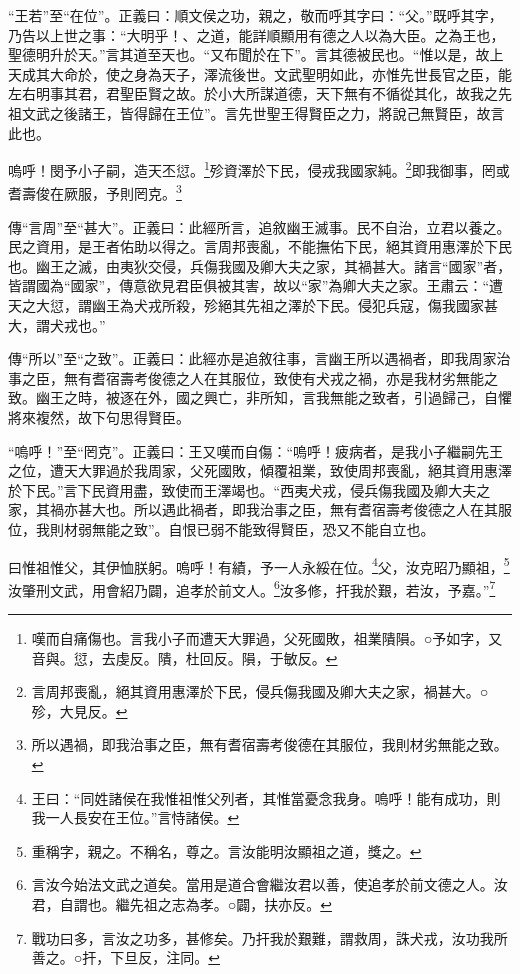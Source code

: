 {\noindent\shu{}\fzkt “王若”至“在位”。正義曰：順文侯之功，親之，敬而呼其字曰：“父。”既呼其字，乃告以上世之事：“大明乎！、之道，能詳順顯用有德之人以為大臣。之為王也，聖德明升於天。”言其道至天也。“又布聞於在下”。言其德被民也。“惟以是，故上天成其大命於，使之身為天子，澤流後世。文武聖明如此，亦惟先世長官之臣，能左右明事其君，君聖臣賢之故。於小大所謀道德，天下無有不循從其化，故我之先祖文武之後諸王，皆得歸在王位”。言先世聖王得賢臣之力，將說己無賢臣，故言此也。 \par}

嗚呼！閔予小子嗣，造天丕愆。\footnote{嘆而自痛傷也。言我小子而遭天大罪過，父死國敗，祖業隤隕。○予如字，又音與。愆，去虔反。隤，杜回反。隕，于敏反。}殄資澤於下民，侵戎我國家純。\footnote{言周邦喪亂，絕其資用惠澤於下民，侵兵傷我國及卿大夫之家，禍甚大。○殄，大見反。}即我御事，罔或耆壽俊在厥服，予則罔克。\footnote{所以遇禍，即我治事之臣，無有耆宿壽考俊德在其服位，我則材劣無能之致。}


{\noindent\zhuan{}\fzbyks 傳“言周”至“甚大”。正義曰：此經所言，追敘幽王滅事。民不自治，立君以養之。民之資用，是王者佑助以得之。言周邦喪亂，不能撫佑下民，絕其資用惠澤於下民也。幽王之滅，由夷狄交侵，兵傷我國及卿大夫之家，其禍甚大。諸言“國家”者，皆謂國為“國家”，傳意欲見君臣俱被其害，故以“家”為卿大夫之家。王肅云：“遭天之大愆，謂幽王為犬戎所殺，殄絕其先祖之澤於下民。侵犯兵寇，傷我國家甚大，謂犬戎也。” \par}

{\noindent\zhuan{}\fzbyks 傳“所以”至“之致”。正義曰：此經亦是追敘往事，言幽王所以遇禍者，即我周家治事之臣，無有耆宿壽考俊德之人在其服位，致使有犬戎之禍，亦是我材劣無能之致。幽王之時，被逐在外，國之興亡，非所知，言我無能之致者，引過歸己，自懼將來複然，故下句思得賢臣。 \par}

{\noindent\shu{}\fzkt “嗚呼！”至“罔克”。正義曰：王又嘆而自傷：“嗚呼！疲病者，是我小子繼嗣先王之位，遭天大罪過於我周家，父死國敗，傾覆祖業，致使周邦喪亂，絕其資用惠澤於下民。”言下民資用盡，致使而王澤竭也。“西夷犬戎，侵兵傷我國及卿大夫之家，其禍亦甚大也。所以遇此禍者，即我治事之臣，無有耆宿壽考俊德之人在其服位，我則材弱無能之致”。自恨已弱不能致得賢臣，恐又不能自立也。 \par}

曰惟祖惟父，其伊恤朕躬。嗚呼！有績，予一人永綏在位。\footnote{王曰：“同姓諸侯在我惟祖惟父列者，其惟當憂念我身。嗚呼！能有成功，則我一人長安在王位。”言恃諸侯。}父，汝克昭乃顯祖，\footnote{重稱字，親之。不稱名，尊之。言汝能明汝顯祖之道，獎之。}汝肇刑文武，用會紹乃闢，追孝於前文人。\footnote{言汝今始法文武之道矣。當用是道合會繼汝君以善，使追孝於前文德之人。汝君，自謂也。繼先祖之志為孝。○闢，扶亦反。}汝多修，扞我於艱，若汝，予嘉。”\footnote{戰功曰多，言汝之功多，甚修矣。乃扞我於艱難，謂救周，誅犬戎，汝功我所善之。○扞，下旦反，注同。}


